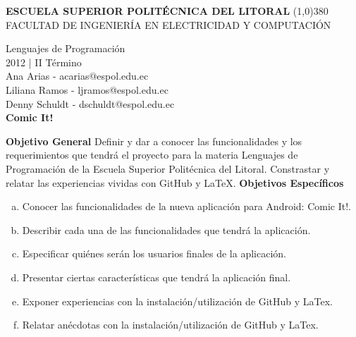 \documentclass[12pt]{report}
\begin{document}
	\setlength{\topmargin}{-0.5in}
	\pagestyle{empty}
	\begin{center}
		\textbf{
			\vspace{-0.7em}
			ESCUELA SUPERIOR POLITÉCNICA DEL LITORAL
		}
		\line(1,0){380}\\		
		\scriptsize{FACULTAD DE INGENIERÍA EN ELECTRICIDAD Y COMPUTACIÓN}
	\end{center}
	\begin{center}
		\vspace{2.5em}
		Lenguajes de Programación
		\\2012 | II Término
		\vspace{1.5em}
		\\Ana Arias - acarias@espol.edu.ec
		\vspace{4mm}
		\\Liliana Ramos - ljramos@espol.edu.ec
		\\Denny Schuldt - dschuldt@espol.edu.ec
		\vspace{3em}
		\Huge{\textbf{\\Comic It!	\vspace{1em}}}
	\end{center}	
	\begingroup
		\large{
			\textbf{
				Objetivo General
				\newline
				\newline
			}
		}
	\endgroup
	Definir y dar a conocer las funcionalidades y los requerimientos que tendrá el proyecto para la materia Lenguajes de Programación de la Escuela Superior Politécnica del Litoral. 
\newline
\newline
Constrastar y relatar las experiencias vividas con GitHub y LaTeX.
	\vspace{4em}
	\newline
	\begingroup
		\large{
			\textbf{
				Objetivos Específicos
				\newline
			}
		}
	\endgroup
		\begin{enumerate}[(a)]%
		\item Conocer las funcionalidades de la nueva aplicación para Android: Comic It!.
		\item Describir cada una de las funcionalidades que tendrá la aplicación.
		\item Especificar quiénes serán los usuarios finales de la aplicación.
		\item Presentar ciertas características que tendrá la aplicación final.
		\item Exponer experiencias con la instalación/utilización de GitHub y LaTex.
		\item Relatar anécdotas con la instalación/utilización de GitHub y LaTex.
		\end{enumerate}
	
\end{document}
